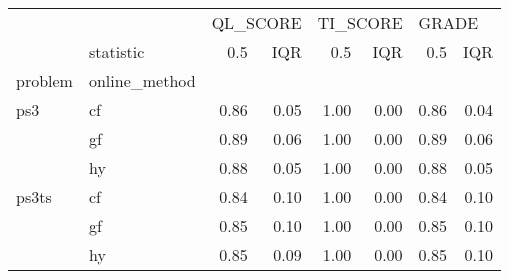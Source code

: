 \begin{tabular}{llrrrrrr}
\toprule
      & {} & \multicolumn{2}{l}{QL\_SCORE} & \multicolumn{2}{l}{TI\_SCORE} & \multicolumn{2}{l}{GRADE} \\
      & statistic &      0.5 &  IQR &      0.5 &  IQR &   0.5 &  IQR \\
problem & online\_method &          &      &          &      &       &      \\
\midrule
ps3 & cf &     0.86 & 0.05 &     1.00 & 0.00 &  0.86 & 0.04 \\
      & gf &     0.89 & 0.06 &     1.00 & 0.00 &  0.89 & 0.06 \\
      & hy &     0.88 & 0.05 &     1.00 & 0.00 &  0.88 & 0.05 \\
ps3ts & cf &     0.84 & 0.10 &     1.00 & 0.00 &  0.84 & 0.10 \\
      & gf &     0.85 & 0.10 &     1.00 & 0.00 &  0.85 & 0.10 \\
      & hy &     0.85 & 0.09 &     1.00 & 0.00 &  0.85 & 0.10 \\
\bottomrule
\end{tabular}
